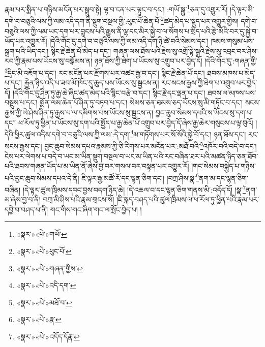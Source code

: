 རྣམ་པར་སྨིན་པ་གཉིས་མངོན་པར་སྒྲུབ་སྟེ། ལྟ་བ་ངན་པར་ལྟུང་བ་དང་། :གཡོ་སྒྱུ་\footnote{«སྣར་»«པེ་»གཡོ་}ཅན་དུ་འགྱུར་རོ། །དེ་ལྟར་མི་དགེ་བ་བཅུའི་ལས་ཀྱི་ལམ་འདི་དག་ནི་སྡུག་བསྔལ་གྱི་:ཕུང་པོ་ཆེན་པོ་\footnote{«སྣར་»«པེ་»ཕུང་པོ་}ཚད་མེད་པ་སྡུད་པར་འགྱུར་གྱིས། དགེ་བ་བཅུའི་ལས་ཀྱི་ལམ་ཡང་དག་པར་བླངས་པའི་རྒྱུས་ནི་ལྷ་དང་མིར་སྐྱེ་བ་ལ་སོགས་པ་སྲིད་པའི་རྩེ་མོའི་བར་དུ་སྐྱེ་བ་ཡོད་པར་འགྱུར་རོ། །དེའི་གོང་དུ་དགེ་བ་བཅུའི་ལས་ཀྱི་ལམ་འདི་དག་ཉི་ཚེ་བའི་སེམས་དང་། ཁམས་གསུམ་པས་སྐྲག་པའི་ཡིད་དང་། སྙིང་རྗེ་ཆེན་པོ་མེད་པ་དང་། གཞན་ལས་ཐོས་པའི་རྗེས་སུ་འགྲོ་སྟེ་སྒྲའི་རྗེས་སུ་འབྲང་བར་ཤེས་རབ་ཀྱི་རྣམ་པས་ཡོངས་སུ་བསྒོམས་ན། ཉན་ཐོས་ཀྱི་ཐེག་པ་ཡོངས་སུ་འགྲུབ་པར་བྱེད་དོ། །དེའི་གོང་དུ་:གཞན་གྱི་\footnote{«སྣར་»«པེ་»གཞན་གྱིས་}དྲིང་མི་འཇོག་པ་དང་། རང་མངོན་པར་རྫོགས་པར་འཚང་རྒྱ་བ་དང་། སྙིང་རྗེ་ཆེན་པོ་དང་། ཐབས་མཁས་པ་མེད་པ་དང་། རྐྱེན་ཉིད་འདི་པ་ཟབ་མོ་ཁོང་དུ་ཆུད་པས་ཡོངས་སུ་སྦྱངས་ན། རང་སངས་རྒྱས་ཀྱི་ཐེག་པ་འགྲུབ་པར་བྱེད་དོ། །དེའི་གོང་དུ་ཤིན་ཏུ་རྒྱ་ཆེ་ཞིང་ཚད་མེད་པའི་སྙིང་བརྩེ་བ་དང་། སྙིང་རྗེ་དང་ལྡན་པ་དང་། ཐབས་ལ་མཁས་པས་བསྡུས་པ་དང་། སྨོན་ལམ་ཆེན་པོ་ཤིན་ཏུ་བཏབ་པ་དང་། སེམས་ཅན་ཐམས་ཅད་ཡོངས་སུ་མི་གཏོང་བ་དང་། སངས་རྒྱས་ཀྱི་ཡེ་ཤེས་ཤིན་ཏུ་རྒྱས་པ་ལ་དམིགས་པས་ཡོངས་སུ་སྦྱངས་ན། བྱང་ཆུབ་སེམས་དཔའི་ས་ཡོངས་སུ་དག་པ་དང་། ཕ་རོལ་ཏུ་ཕྱིན་པ་ཡོངས་སུ་དག་པའི་སྤྱོད་པ་རྒྱ་ཆེན་པོ་འགྲུབ་པར་བྱེད་དོ་ཞེས་རྒྱ་ཆེར་གསུངས་པ་ལྟ་བུའོ། །དེའི་ཕྱིར་ཚུལ་འདིས་དགེ་བ་བཅུའི་ལས་ཀྱི་ལམ་:དེ་དག་\footnote{«སྣར་»«པེ་»འདི་དག་}མ་གཏོགས་པར་སོ་སོའི་སྐྱེ་བོ་དང་། ཉན་ཐོས་དང་། རང་སངས་རྒྱས་དང་། བྱང་ཆུབ་སེམས་དཔའ་རྣམས་ཀྱི་ཅི་རིགས་པར་མངོན་པར་:མཐོ་བའི་\footnote{«སྣར་»«པེ་»མཐོ་བ་}འཁོར་བའི་བདེ་བ་དང་། ངེས་པར་ལེགས་པ་བདེ་བ་ཡང་མ་ཡིན་སྡུག་བསྔལ་བ་ཡང་མ་ཡིན་པའི་རང་བཞིན་ཐར་པའི་མཚན་ཉིད་ཅན་ཐོབ་པའི་ཐབས་གཞན་ཡོད་པ་མ་ཡིན་ནོ་ཞེས་བྱ་བར་གསལ་བར་བསྟན་པར་འགྱུར་རོ། །གང་སེམས་བསྐྱེད་པ་གཉིས་པའི་བྱང་ཆུབ་སེམས་དཔའ་དེ་ནི། ཇི་ལྟར་རྒྱ་མཚོ་རོ་དང་ལྷན་ཅིག་དང་། །བཀྲ་ཤིས་སྣ་\footnote{«སྣར་»«པེ་»རྣ་}ནག་མ་དང་ལྷན་ཅིག་བཞིན། །དེ་ལྟར་ཚུལ་ཁྲིམས་དབང་བྱས་བདག་ཉིད་ཆེ། །དེ་འཆལ་བ་དང་ལྷན་ཅིག་གནས་མི་:འདོད་དོ། །སྣ་\footnote{«སྣར་»«པེ་»འདོད་དོརྣ་}ནག་མ་ཞེས་བྱ་བ་ནི། བཀྲ་མི་ཤིས་པའི་རྣམ་གྲངས་སོ། །ཇི་སྐད་བཤད་པའི་ཚུལ་ཁྲིམས་ལ་ཕ་རོལ་ཏུ་ཕྱིན་པའི་རྣམ་པར་དབྱེ་བ་བཤད་པ་ནི། གང་གིས་གང་ཞིག་གང་ལ་སྤོང་བྱེད་པ། །
